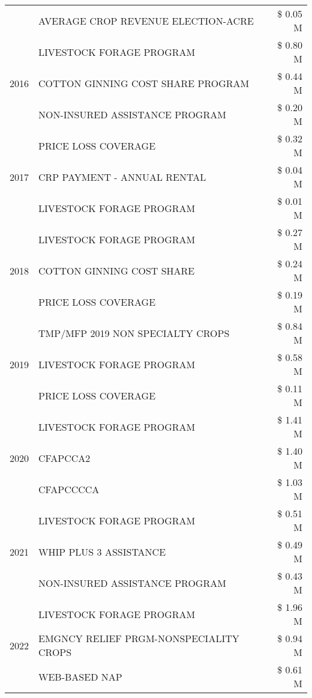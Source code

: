\begin{tabular}{llr}
 & AVERAGE CROP REVENUE ELECTION-ACRE & \$ 0.05 M \\
\cline{1-3}
\multirow[t]{3}{*}{2016} & LIVESTOCK FORAGE PROGRAM & \$ 0.80 M \\
 & COTTON GINNING COST SHARE PROGRAM & \$ 0.44 M \\
 & NON-INSURED ASSISTANCE PROGRAM & \$ 0.20 M \\
\cline{1-3}
\multirow[t]{3}{*}{2017} & PRICE LOSS COVERAGE & \$ 0.32 M \\
 & CRP PAYMENT - ANNUAL RENTAL & \$ 0.04 M \\
 & LIVESTOCK FORAGE PROGRAM & \$ 0.01 M \\
\cline{1-3}
\multirow[t]{3}{*}{2018} & LIVESTOCK FORAGE PROGRAM & \$ 0.27 M \\
 & COTTON GINNING COST SHARE & \$ 0.24 M \\
 & PRICE LOSS COVERAGE & \$ 0.19 M \\
\cline{1-3}
\multirow[t]{3}{*}{2019} & TMP/MFP 2019 NON SPECIALTY CROPS & \$ 0.84 M \\
 & LIVESTOCK FORAGE PROGRAM & \$ 0.58 M \\
 & PRICE LOSS COVERAGE & \$ 0.11 M \\
\cline{1-3}
\multirow[t]{3}{*}{2020} & LIVESTOCK FORAGE PROGRAM & \$ 1.41 M \\
 & CFAPCCA2 & \$ 1.40 M \\
 & CFAPCCCCA & \$ 1.03 M \\
\cline{1-3}
\multirow[t]{3}{*}{2021} & LIVESTOCK FORAGE PROGRAM & \$ 0.51 M \\
 & WHIP PLUS 3 ASSISTANCE & \$ 0.49 M \\
 & NON-INSURED ASSISTANCE PROGRAM & \$ 0.43 M \\
\cline{1-3}
\multirow[t]{3}{*}{2022} & LIVESTOCK FORAGE PROGRAM & \$ 1.96 M \\
 & EMGNCY RELIEF PRGM-NONSPECIALITY CROPS & \$ 0.94 M \\
 & WEB-BASED NAP & \$ 0.61 M \\
\cline{1-3}
\bottomrule
\end{tabular}
